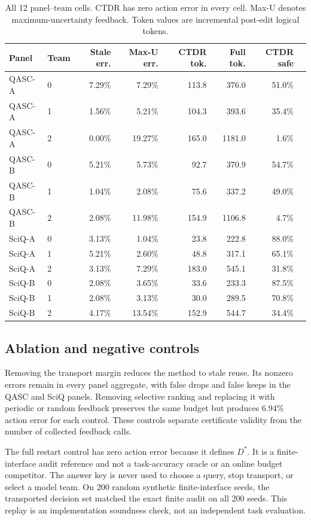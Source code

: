 \documentclass[11pt]{article}
\begin{document}
\begin{table}[t]
\centering\scriptsize
\begin{tabular}{llrrrrrr}
\toprule
Panel & Team & Stale err. & Max-U err. & CTDR tok. & Full tok. & CTDR safe \\
\midrule
QASC-A & 0 & 7.29\% & 7.29\% & 113.8 & 376.0 & 51.0\% \\
QASC-A & 1 & 1.56\% & 5.21\% & 104.3 & 393.6 & 35.4\% \\
QASC-A & 2 & 0.00\% & 19.27\% & 165.0 & 1181.0 & 1.6\% \\
QASC-B & 0 & 5.21\% & 5.73\% & 92.7 & 370.9 & 54.7\% \\
QASC-B & 1 & 1.04\% & 2.08\% & 75.6 & 337.2 & 49.0\% \\
QASC-B & 2 & 2.08\% & 11.98\% & 154.9 & 1106.8 & 4.7\% \\
SciQ-A & 0 & 3.13\% & 1.04\% & 23.8 & 222.8 & 88.0\% \\
SciQ-A & 1 & 5.21\% & 2.60\% & 48.8 & 317.1 & 65.1\% \\
SciQ-A & 2 & 3.13\% & 7.29\% & 183.0 & 545.1 & 31.8\% \\
SciQ-B & 0 & 2.08\% & 3.65\% & 33.6 & 233.3 & 87.5\% \\
SciQ-B & 1 & 2.08\% & 3.13\% & 30.0 & 289.5 & 70.8\% \\
SciQ-B & 2 & 4.17\% & 13.54\% & 152.9 & 544.7 & 34.4\% \\
\bottomrule
\end{tabular}
\caption{All 12 panel--team cells. CTDR has zero action error in every cell. Max-U denotes maximum-uncertainty feedback. Token values are incremental post-edit logical tokens.}
\label{tab:teams}
\end{table}

\subsection{Ablation and negative controls}
Removing the transport margin reduces the method to stale reuse. Its nonzero errors remain in every panel aggregate, with false drops and false keeps in the QASC and SciQ panels. Removing selective ranking and replacing it with periodic or random feedback preserves the same budget but produces 6.94\% action error for each control. These controls separate certificate validity from the number of collected feedback calls.

The full restart control has zero action error because it defines $D^*$. It is a finite-interface audit reference and not a task-accuracy oracle or an online budget competitor. The answer key is never used to choose a query, stop transport, or select a model team.
On 200 random synthetic finite-interface seeds, the transported decision set matched the exact finite audit on all 200 seeds. This replay is an implementation soundness check, not an independent task evaluation.
\end{document}
